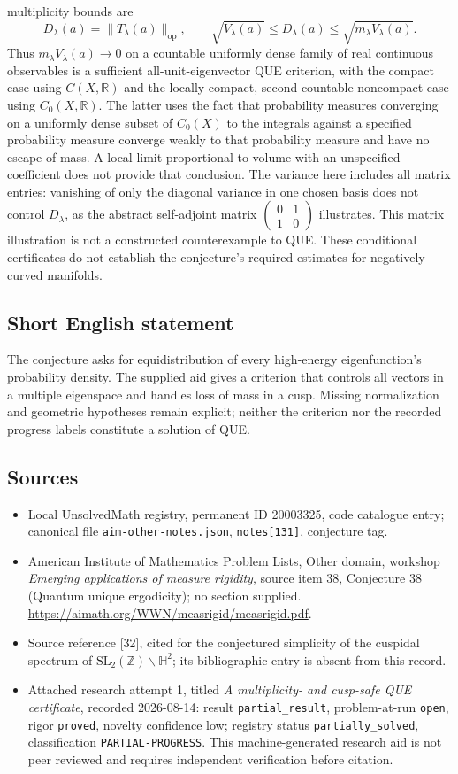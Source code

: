 \documentclass[11pt]{article}
\newcommand{\Z}{\mathbb{Z}}
\newcommand{\R}{\mathbb{R}}
\begin{document}
multiplicity bounds are\[D_\lambda(a)=\|T_\lambda(a)\|_{\mathrm{op}},\qquad \sqrt{V_\lambda(a)}\le D_\lambda(a)\le\sqrt{m_\lambda V_\lambda(a)}.\] Thus \(m_\lambda V_\lambda(a)\to0\) on a countable uniformly dense family of real continuous observables is a sufficient all-unit-eigenvector QUE criterion, with the compact case using \(C(X,\R)\) and the locally compact, second-countable noncompact case using \(C_0(X,\R)\). The latter uses the fact that probability measures converging on a uniformly dense subset of \(C_0(X)\) to the integrals against a specified probability measure converge weakly to that probability measure and have no escape of mass. A local limit proportional to volume with an unspecified coefficient does not provide that conclusion. The variance here includes all matrix entries: vanishing of only the diagonal variance in one chosen basis does not control \(D_\lambda\), as the abstract self-adjoint matrix \(\left(\begin{smallmatrix}0&1\\1&0\end{smallmatrix}\right)\) illustrates. This matrix illustration is not a constructed counterexample to QUE. These conditional certificates do not establish the conjecture's required estimates for negatively curved manifolds.
\subsection{Short English statement}
The conjecture asks for equidistribution of every high-energy eigenfunction's probability density. The supplied aid gives a criterion that controls all vectors in a multiple eigenspace and handles loss of mass in a cusp. Missing normalization and geometric hypotheses remain explicit; neither the criterion nor the recorded progress labels constitute a solution of QUE.
\subsection{Sources}
\begin{itemize}\item Local UnsolvedMath registry, permanent ID 20003325, code catalogue entry; canonical file \texttt{aim-other-notes.json}, \texttt{notes[131]}, conjecture tag.\item American Institute of Mathematics Problem Lists, Other domain, workshop \emph{Emerging applications of measure rigidity}, source item 38, Conjecture 38 (Quantum unique ergodicity); no section supplied. \url{https://aimath.org/WWN/measrigid/measrigid.pdf}.\item Source reference [32], cited for the conjectured simplicity of the cuspidal spectrum of \(\mathrm{SL}_2(\Z)\backslash\mathbb H^2\); its bibliographic entry is absent from this record.\item Attached research attempt 1, titled \emph{A multiplicity- and cusp-safe QUE certificate}, recorded 2026-08-14: result \texttt{partial\_result}, problem-at-run \texttt{open}, rigor \texttt{proved}, novelty confidence low; registry status \texttt{partially\_solved}, classification \texttt{PARTIAL-PROGRESS}. This machine-generated research aid is not peer reviewed and requires independent verification before citation.\end{itemize}
\end{document}
